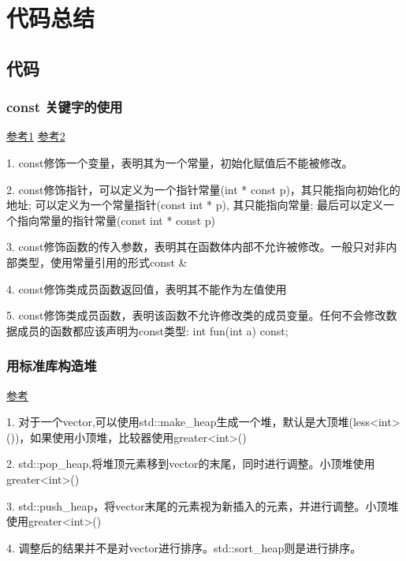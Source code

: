 \chapter{代码总结}
\section{代码}
\subsection{const 关键字的使用}
\href{https://blog.csdn.net/lf1570180470/article/details/56677748}{参考1}
\href{https://www.cnblogs.com/azbane/p/7266747.html}{参考2}

1. const修饰一个变量，表明其为一个常量，初始化赋值后不能被修改。

2. const修饰指针，可以定义为一个指针常量(int * const p)，其只能指向初始化的地址; 可以定义为一个常量指针(const int * p), 其只能指向常量; 最后可以定义一个指向常量的指针常量(const int * const p)

3. const修饰函数的传入参数，表明其在函数体内部不允许被修改。一般只对非内部类型，使用常量引用的形式const \&

4. const修饰类成员函数返回值，表明其不能作为左值使用

5. const修饰类成员函数，表明该函数不允许修改类的成员变量。任何不会修改数据成员的函数都应该声明为const类型: int fun(int a) const;

\subsection{用标准库构造堆}
\href{http://www.cplusplus.com/reference/algorithm/make_heap/?kw=make_heap}{参考}

1. 对于一个vector,可以使用std::make_heap生成一个堆，默认是大顶堆(less<int>())，如果使用小顶堆，比较器使用greater<int>()

2. std::pop_heap,将堆顶元素移到vector的末尾，同时进行调整。小顶堆使用greater<int>()

3. std::push_heap，将vector末尾的元素视为新插入的元素，并进行调整。小顶堆使用greater<int>()

4. 调整后的结果并不是对vector进行排序。std::sort_heap则是进行排序。